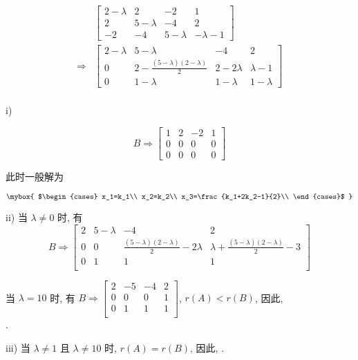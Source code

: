 $$
\begin{aligned}
    &\left[\begin{array}{ccc|c}
        2-\lambda&2&-2&1\\
        2&5-\lambda&-4&2\\
        -2&-4&5-\lambda&-\lambda-1
    \end{array}\right]\\
    \Rightarrow&
    \left[\begin{array}{ccc|c}
        2-\lambda&5-\lambda&-4&2\\
        0&2-\frac{(5-\lambda)(2-\lambda)}{2}&2-2\lambda&\lambda-1\\
        0&1-\lambda&1-\lambda&1-\lambda
    \end{array}\right]\\
\end{aligned}
$$

i)   

$$
B\Rightarrow\begin{bmatrix}
    1&2&-2&1\\0&0&0&0\\0&0&0&0
\end{bmatrix}
$$

此时一般解为

$$
\mybox{
$\begin{cases}
    x_1=k_1\\
    x_2=k_2\\
    x_3=\frac{k_1+2k_2-1}{2}\\
\end{cases}$
}
$$

ii) 当 $\lambda\not =0$ 时, 有
$$
B\Rightarrow\begin{bmatrix}
    2&5-\lambda&-4&2\\
    0&0&\frac{(5-\lambda)(2-\lambda)}{2}-2\lambda&\lambda+\frac{(5-\lambda)(2-\lambda)}{2}-3\\
    0&1&1&1\\
\end{bmatrix}
$$

当 $\lambda=10$ 时, 有 
$B\Rightarrow
\begin{bmatrix}
    2&-5&-4&2\\0&0&0&1\\0&1&1&1\\
\end{bmatrix}$,
$r(A)<r(B)$, 因此, \\
.

iii) 当 $\lambda\not=1$ 且 $\lambda\not=10$ 时, $r(A)=r(B)$, 因此, .

